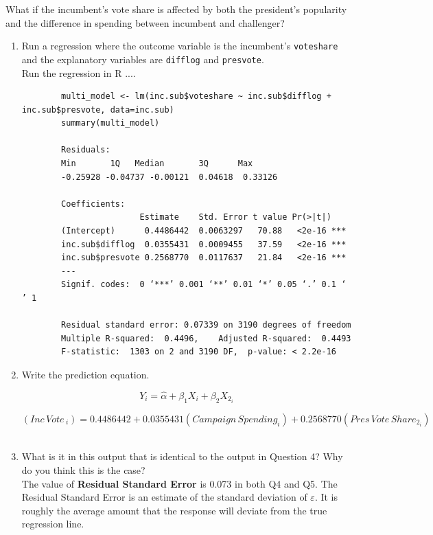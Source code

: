 \documentclass[12pt,letterpaper]{article}
\begin{document}
\noindent What if the incumbent's vote share is affected by both the president's popularity and the difference in spending between incumbent and challenger? \\
	\begin{enumerate}
		\item Run a regression where the outcome variable is the incumbent's \texttt{voteshare} and the explanatory variables are \texttt{difflog} and \texttt{presvote}.	\\
		
		Run the regression in R ....
					\begin{verbatim}
		multi_model <- lm(inc.sub$voteshare ~ inc.sub$difflog + inc.sub$presvote, data=inc.sub)
		summary(multi_model)
		
		Residuals:
		Min       1Q   Median       3Q      Max 
		-0.25928 -0.04737 -0.00121  0.04618  0.33126 
		
		Coefficients:
						Estimate    Std. Error t value Pr(>|t|)    
		(Intercept)      0.4486442  0.0063297   70.88   <2e-16 ***
		inc.sub$difflog  0.0355431  0.0009455   37.59   <2e-16 ***
		inc.sub$presvote 0.2568770  0.0117637   21.84   <2e-16 ***
		---
		Signif. codes:  0 ‘***’ 0.001 ‘**’ 0.01 ‘*’ 0.05 ‘.’ 0.1 ‘ ’ 1
		
		Residual standard error: 0.07339 on 3190 degrees of freedom
		Multiple R-squared:  0.4496,	Adjusted R-squared:  0.4493 
		F-statistic:  1303 on 2 and 3190 DF,  p-value: < 2.2e-16
					\end{verbatim} 
					
					
										
		\item Write the prediction equation.	
		
		{\large 			$$ {Y}_i = \hat{\alpha} +  {\beta_1}X_i + {\beta_2}X_{2_i} $$}
		
		
		{ $$ ({Inc\, Vote \,}_i) =  0.4486442 + 0.0355431(Campaign \, Spending_i) + 0.2568770 (Pres\, Vote\, Share_{2_i} ) $$  } \\
	
		\newpage		
		
		\item What is it in this output that is identical to the output in Question 4? Why do you think this is the case? \\
		
		The value of \textbf{Residual Standard Error} is 0.073 in both Q4 and Q5. 		The Residual Standard Error is an estimate of the standard deviation of  $\varepsilon$. It is roughly the average amount that the response will deviate from the true regression line.
		

\end{enumerate}
\end{document}
